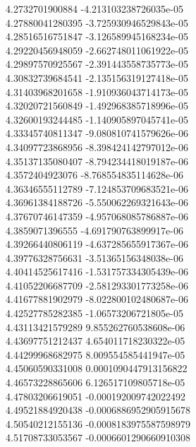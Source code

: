 {4.2732701900884 -4.213103238726035e-05 \\
4.27880041280395 -3.725930946529843e-05 \\
4.28516516751847 -3.126589945168234e-05 \\
4.29220456948059 -2.662748011061922e-05 \\
4.29897570925567 -2.391443558735773e-05 \\
4.30832739684541 -2.135156319127418e-05 \\
4.31403968201658 -1.910936043714173e-05 \\
4.32020721560849 -1.492968385718996e-05 \\
4.32600193244485 -1.140905897045741e-05 \\
4.33345740811347 -9.080810741579626e-06 \\
4.34097723868956 -8.398424142797012e-06 \\
4.35137135080407 -8.794234418019187e-06 \\
4.3572404923076 -8.768554835114628e-06 \\
4.36346555112789 -7.124853709683521e-06 \\
4.36961384188726 -5.550062269321643e-06 \\
4.37670746147359 -4.957068085786887e-06 \\
4.3859071396555 -4.691790763899917e-06 \\
4.39266440806119 -4.637285655917367e-06 \\
4.39776328756631 -3.51365156348038e-06 \\
4.40414525617416 -1.531757334305439e-06 \\
4.41052206687709 -2.581293301773258e-06 \\
4.41677881902979 -8.022800102480687e-06 \\
4.42527785282385 -1.06573206721805e-05 \\
4.43113421579289 9.855262760538608e-06 \\
4.43697751212437 4.654011718230322e-05 \\
4.44299968682975 8.009554585441947e-05 \\
4.45060590331008 0.0001090447913156822 \\
4.46573228865606 6.126517109805718e-05 \\
4.47803206619051 -0.000192009742022492 \\
4.49521884920438 -0.0006886952905915678 \\
4.50540212155136 -0.0008183975587598979 \\
4.51708733053567 -0.0006601290660910308 \\
}
